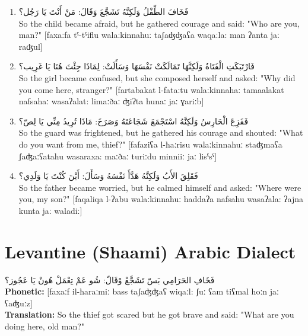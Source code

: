 \documentclass[letterpaper,12pt]{article}
\begin{document}
\begin{enumerate}
\item \textarabic{فَخَافَ الطِّفْلُ وَلَكِنَّهُ تَشَجَّعَ وَقَالَ: مَنْ أَنْتَ يَا رَجُل؟}\\
So the child became afraid, but he gathered courage and said: "Who are you, man?" [faxaːfa tˤ-tˤiflu walaːkinnahuː taʃaʤʤaʕa waqaːla: man ʔanta jaː raʤul]

\item \textarabic{فَارْتَبَكَتِ الْفَتَاةُ وَلَكِنَّهَا تَمَالَكَتْ نَفْسَهَا وَسَأَلَتْ: لِمَاذَا جِئْتَ هُنَا يَا غَرِيب؟}\\
So the girl became confused, but she composed herself and asked: "Why did you come here, stranger?" [fartabakat l-fataːtu walaːkinnahaː tamaalakat nafsahaː wasaʔalat: limaːðaː ʤiʔta hunaː jaː ɣariːb]

\item \textarabic{فَفَزِعَ الْحَارِسُ وَلَكِنَّهُ اسْتَجْمَعَ شَجَاعَتَهُ وَصَرَخَ: مَاذَا تُرِيدُ مِنِّي يَا لِصّ؟}\\
So the guard was frightened, but he gathered his courage and shouted: "What do you want from me, thief?" [fafaziʕa l-ħaːrisu walaːkinnahuː staʤmaʕa ʃaʤaːʕatahu wasaraxa: maːðaː turiːdu minniiː jaː lisˤsˤ]

\item \textarabic{فَقَلِقَ الأَبُ وَلَكِنَّهُ هَدَّأَ نَفْسَهُ وَسَأَلَ: أَيْنَ كُنْتَ يَا وَلَدِي؟}\\
So the father became worried, but he calmed himself and asked: "Where were you, my son?" [faqaliqa l-ʔabu walaːkinnahuː haddaʔa nafsahu wasaʔala: ʔajna kunta jaː waladiː]
\end{enumerate}

\section{Levantine (Shaami) Arabic Dialect}

\begin{tcolorbox}[colback=white,colframe=dialectcolor,title=\textbf{Levantine Version},breakable]
\textarabic{فَخَافِ الحَرَامِي بَسّ تَشَجَّعْ وْقَالّ: شُو عَمْ تِعْمَلْ هُونْ يَا عَجُوز؟}\\
\textbf{Phonetic:} [faxaːf il-ħaraːmiː bass taʃaʤʤaʕ wiqaːl: ʃuː ʕam tiʕmal hoːn jaː ʕaʤuːz]\\
\textbf{Translation:} So the thief got scared but he got brave and said: "What are you doing here, old man?"
\end{tcolorbox}
\end{document}
